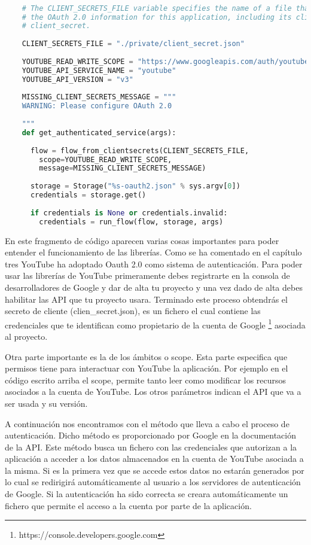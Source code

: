 \begin{lstlisting}[language=Python]

    # The CLIENT_SECRETS_FILE variable specifies the name of a file that contains
    # the OAuth 2.0 information for this application, including its client_id and
    # client_secret.
    
    CLIENT_SECRETS_FILE = "./private/client_secret.json"
    
    YOUTUBE_READ_WRITE_SCOPE = "https://www.googleapis.com/auth/youtube"
    YOUTUBE_API_SERVICE_NAME = "youtube"
    YOUTUBE_API_VERSION = "v3"
    
    MISSING_CLIENT_SECRETS_MESSAGE = """
    WARNING: Please configure OAuth 2.0
      
    """
    def get_authenticated_service(args):
    
      flow = flow_from_clientsecrets(CLIENT_SECRETS_FILE,
        scope=YOUTUBE_READ_WRITE_SCOPE,
        message=MISSING_CLIENT_SECRETS_MESSAGE)
    
      storage = Storage("%s-oauth2.json" % sys.argv[0])
      credentials = storage.get()
    
      if credentials is None or credentials.invalid:
        credentials = run_flow(flow, storage, args)


\end{lstlisting}

En este fragmento de código aparecen varias cosas importantes para poder entender el funcionamiento de las librerías. Como se ha comentado en el capítulo tres YouTube ha adoptado Oauth 2.0 como sistema de autenticación. Para poder usar las librerías de YouTube primeramente debes registrarte en la consola de desarrolladores de Google  y dar de alta tu proyecto y una vez dado de alta debes habilitar las API que tu proyecto usara. Terminado este proceso obtendrás el secreto de cliente (clien\_secret.json), es un fichero el cual contiene las credenciales que te identifican como propietario de la cuenta de Google \footnote{https://console.developers.google.com} asociada al proyecto.

Otra parte importante es la de los ámbitos o scope. Esta parte especifica que permisos tiene para interactuar con YouTube la aplicación. Por ejemplo en el código escrito arriba el scope, permite tanto leer como modificar los recursos asociados a la cuenta de YouTube. Los otros parámetros indican el API que va a ser usada y su versión. 

A continuación nos encontramos con el método que lleva a cabo el proceso de autenticación. Dicho método es proporcionado por Google en la documentación de la API. Este método busca un fichero con las credenciales que autorizan a la aplicación a acceder a los datos almacenados en la cuenta de YouTube asociada a la misma. Si es la primera vez que se accede estos datos no estarán generados por lo cual se redirigirá automáticamente al usuario a los servidores de autenticación de Google. Si la autenticación ha sido correcta se creara automáticamente un fichero que permite el acceso a la cuenta por parte de la aplicación.

